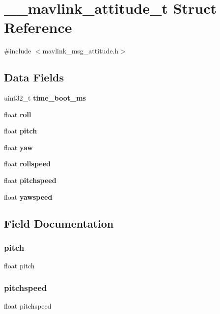 \section{\+\_\+\+\_\+mavlink\+\_\+attitude\+\_\+t Struct Reference}
\label{struct____mavlink__attitude__t}


{\ttfamily \#include $<$mavlink\+\_\+msg\+\_\+attitude.\+h$>$}

\subsection*{Data Fields}
\begin{DoxyCompactItemize}
\item 
uint32\+\_\+t \textbf{ time\+\_\+boot\+\_\+ms}
\item 
float \textbf{ roll}
\item 
float \textbf{ pitch}
\item 
float \textbf{ yaw}
\item 
float \textbf{ rollspeed}
\item 
float \textbf{ pitchspeed}
\item 
float \textbf{ yawspeed}
\end{DoxyCompactItemize}


\subsection{Field Documentation}
\mbox{\label{struct____mavlink__attitude__t_a282e7d4378d4a18a805b8980295ac86c}} 
\subsubsection{pitch}
{\footnotesize\ttfamily float pitch}

\mbox{\label{struct____mavlink__attitude__t_abd92124e4ea5164ccec676c82e026984}} 
\subsubsection{pitchspeed}
{\footnotesize\ttfamily float pitchspeed}

